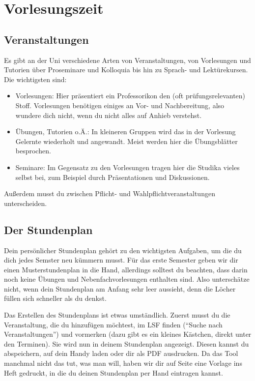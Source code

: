\chapter{Vorlesungszeit}

\section{Veranstaltungen}

Es gibt an der Uni verschiedene Arten von Veranstaltungen, von Vorlesungen und Tutorien über Proseminare und Kolloquia bis hin zu  Sprach- und Lektürekursen. Die wichtigsten sind:

\begin{itemize}
	\item Vorlesungen: Hier präsentiert ein Professorikon den (oft prüfungsrelevanten) Stoff. Vorlesungen benötigen einiges an Vor- und Nachbereitung, also wundere dich nicht, wenn du nicht alles auf Anhieb verstehst.
	\item Übungen, Tutorien o.Ä.: In kleineren Gruppen wird das in der Vorlesung Gelernte wiederholt und angewandt. Meist werden hier die Übungsblätter besprochen.
	\item Seminare: Im Gegensatz zu den Vorlesungen tragen hier die Studika vieles selbst bei, zum Beispiel durch Präsentationen und Diskussionen.
\end{itemize}

Außerdem musst du zwischen Pflicht- und Wahlpflichtveranstaltungen unterscheiden.

\section{Der Stundenplan}

Dein persönlicher Stundenplan gehört zu den wichtigsten Aufgaben, um die du dich jedes Semster neu kümmern musst. Für das erste Semester geben wir dir einen Musterstundenplan in die Hand, allerdings solltest du beachten, dass darin noch keine Übungen und Nebenfachvorlesungen enthalten sind. Also unterschätze nicht, wenn dein Stundenplan am Anfang sehr leer aussieht, denn die Löcher füllen sich schneller als du denkst.

Das Erstellen des Stundenplans ist etwas umständlich. Zuerst musst du die Veranstaltung, die du hinzufügen möchtest, im LSF finden (\enquote{Suche nach Veranstaltungen}) und vormerken (dazu gibt es ein kleines Kästchen, direkt unter den Terminen). Sie wird nun in deinem Stundenplan angezeigt. Diesen kannst du abspeichern, auf dein Handy laden oder dir als PDF ausdrucken. Da das Tool manchmal nicht das tut, was man will, haben wir dir auf Seite \pageref{studenplan} eine Vorlage ins Heft gedruckt, in die du deinen Stundenplan per Hand eintragen kannst.

